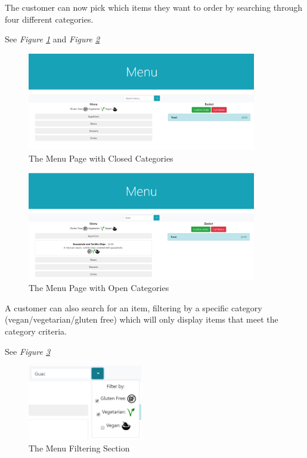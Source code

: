 \documentclass[12pt, twoside, a4paper]{report}
\begin{document}
The customer can now pick which items they want to order by searching through four different categories.

See \textit{Figure \ref{fig:menuClosed}} and \textit{Figure \ref{fig:menuOpen}}

\begin{figure}[H]
  \centering
  \includegraphics[width=10cm]{MenuClosed.png}
  \caption{The Menu Page with Closed Categories}
  \label{fig:menuClosed}
\end{figure}

\begin{figure}[H]
  \centering
  \includegraphics[width=10cm]{MenuOpen.png}
  \caption{The Menu Page with Open Categories}
  \label{fig:menuOpen}
\end{figure}

A customer can also search for an item, filtering by a specific category (vegan/vegetarian/gluten free) which will only display items that meet the category criteria. 

See \textit{Figure \ref{fig:menuFilter}}

\begin{figure}[H]
  \centering
  \includegraphics[width=5cm]{MenuFilter.png}
  \caption{The Menu Filtering Section}
  \label{fig:menuFilter}
\end{figure}
\end{document}
